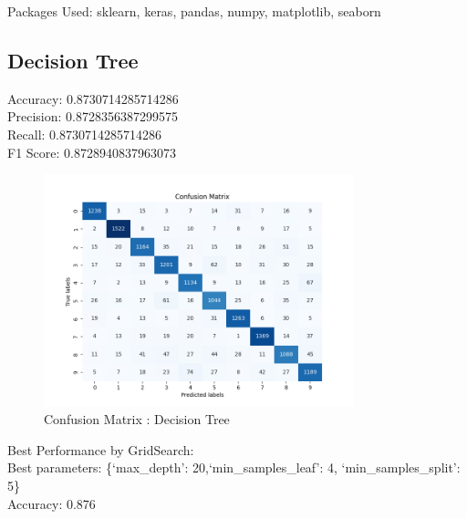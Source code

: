 \documentclass{assignmeownt}
\begin{document}
\maketitle
\thispagestyle{firststyle}

Packages Used: sklearn, keras, pandas, numpy, matplotlib, seaborn

\subsection{Decision Tree}
Accuracy: 0.8730714285714286 \\
Precision: 0.8728356387299575 \\
Recall: 0.8730714285714286 \\
F1 Score: 0.8728940837963073 \\
\begin{figure}[H]
    \centering
    \includegraphics[width=0.8\textwidth]{images/dtcConMat.png}
    \caption{Confusion Matrix : Decision Tree}
    \label{fig:1}
\end{figure}

Best Performance by GridSearch:\\
Best parameters: \{`max\_depth': 20,`min\_samples\_leaf': 4, `min\_samples\_split': 5\}\\
Accuracy: 0.876\\
\end{document}
